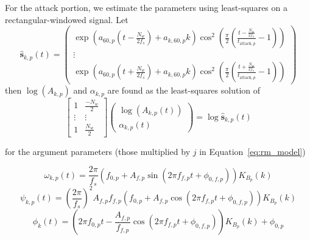 For the attack portion, we estimate the parameters using least-squares on a
rectangular-windowed signal. Let
\begin{equation}
    \hat{\mathbf{s}}_{k,p}(t) =
    \begin{pmatrix}
        \exp \left(\displaystyle a_{60,p} \left( t - \frac{N_{w}}{2f_{s}} \right)  +
        a_{k,60,p} k \right) \cos^{2} \left(\displaystyle \frac{\pi}{2} \left(
                \frac{ t
        - \frac{N_{w}}{2f_{s}} }{ t_{\text{attack},p}} - 1 \right) \right)  \\
        \vdots \\
        \exp \left(\displaystyle a_{60,p} \left( t + \frac{N_{w}}{2f_{s}} \right)  +
        a_{k,60,p} k \right) \cos^{2} \left(\displaystyle \frac{\pi}{2} \left(
                \frac{ t
        + \frac{N_{w}}{2f_{s}}  }{ t_{\text{attack},p}} - 1 \right) \right)
    \end{pmatrix}
\end{equation}
then $\log(A_{k,p})$ and $\alpha_{k,p}$ are found as the least-squares solution of
\begin{equation}
    \begin{bmatrix}
        1 & \frac{-N_{w}}{2} \\
        \vdots & \vdots \\
        1 & \frac{N_{w}}{2}
    \end{bmatrix}
    \begin{pmatrix}
        \log(A_{k,p}(t)) \\
        \alpha_{k,p}(t)
    \end{pmatrix}
    = \log{\hat{\mathbf{s}}_{k,p}(t)}
\end{equation}

for the argument parameters (those multiplied by $j$ in Equation~\eqref{eq:rm_model})

\begin{equation}
    \omega_{k,p} \left( t \right)  = \frac{2 \pi}{f_{s}}  \left(  f_{0,p} +
    A_{f,p} \sin \left( 2 \pi f_{f,p} t + \phi_{0,f,p} \right)  \right)
    K_{B_{p}} \left( k \right) 
\end{equation}
\begin{equation}
    \psi_{k,p} \left( t \right)  =  \left( \frac{2 \pi}{f_{s}} \right) ^{2}
    A_{f,p} f_{f,p}  \left(  f_{0,p} + A_{f,p} \cos \left( 2 \pi f_{f,p} t +
    \phi_{0,f,p} \right)  \right)  K_{B_{p}} \left( k \right) 
\end{equation}
\begin{equation}
    \phi_{k} \left( t \right)  =  \left( 2\pi f_{0,p}t - \frac{A_{f,p}}{f_{f,p}}
    \cos \left( 2\pi f_{f,p} t + \phi_{0,f,p} \right)  \right)  K_{B_{p}} \left(
    k \right)  + \phi_{0,p}
\end{equation}


